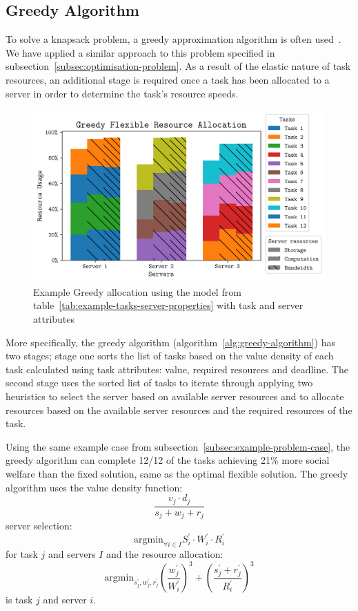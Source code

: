 \subsection{Greedy Algorithm}
\label{subsec:greedy-algorithm}
To solve a knapsack problem, a greedy approximation algorithm is often used~\cite{sahni1975approximate}. We have
applied a similar approach to this problem specified in subsection~\ref{subsec:optimisation-problem}. As a result of
the elastic nature of task resources, an additional stage is required once a task has been allocated to a server in
order to determine the task's resource speeds.

\begin{figure}
    \centering
    \includegraphics[width=\linewidth]{figs/allocation/greedy_flexible_resource_allocation.png}
    \caption{Example Greedy allocation using the model from table~\ref{tab:example-tasks-server-properties}
             with task and server attributes}
    \label{fig:example-greedy-allocation}
\end{figure}

More specifically, the greedy algorithm (algorithm~\ref{alg:greedy-algorithm}) has two stages; stage one sorts the list
of tasks based on the value density of each task calculated using task attributes: value, required resources and
deadline. The second stage uses the sorted list of tasks to iterate through applying two heuristics to select the
server based on available server resources and to allocate resources based on the available server resources and the
required resources of the task.

Using the same example case from subsection~\ref{subsec:example-problem-case}, the greedy algorithm can complete 12/12 of
the tasks achieving 21\% more social welfare than the fixed solution, same as the optimal flexible solution.
The greedy algorithm uses the value density function:
\[\frac{v_j \cdot d_j}{s_j + w_j + r_j}\] server selection:
 \[\text{argmin}_{\forall i \in I} S^{'}_i \cdot W^{'}_i \cdot R^{'}_i\] for task $j$ and servers $I$ and the resource allocation:
\[\text{argmin}_{s^{'}_j, w^{'}_j, r^{'}_j} \left(\frac{w^{'}_j}{W^{'}_i}\right)^3 + \left(\frac{s^{'}_j + r^{'}_j}{R^{'}_i}\right)^3\]
is task $j$ and server $i$.

